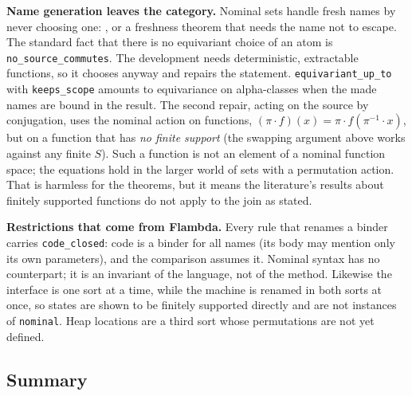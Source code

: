 \documentclass[10pt,a4paper]{article}
\newcommand\code[1]{\texttt{#1}}
\begin{document}
\textbf{Name generation leaves the category.} Nominal sets handle fresh names
by never choosing one: , or a freshness theorem that needs the
name not to escape. The standard fact that there is no equivariant choice of
an atom is \code{no\_source\_commutes}. The development needs deterministic,
extractable functions, so it chooses anyway and repairs the statement.
\code{equivariant\_up\_to} with \code{keeps\_scope} amounts to equivariance on
alpha-classes when the made names are bound in the result. The second repair,
acting on the source by conjugation, uses the nominal action on functions,
$(\pi\cdot f)(x) = \pi\cdot f(\pi^{-1}\cdot x)$, but on a function that has
\emph{no finite support} (the swapping argument above works against any
finite $S$). Such a function is not an element of a nominal function space;
the equations hold in the larger world of sets with a permutation action.
That is harmless for the theorems, but it means the literature's results about
finitely supported functions do not apply to the join as stated.

\textbf{Restrictions that come from Flambda.} Every rule that renames a binder
carries \code{code\_closed}: code is a binder for all names (its body may
mention only its own parameters), and the comparison assumes it. Nominal
syntax has no counterpart; it is an invariant of the language, not of the
method. Likewise the interface is one sort at a time, while the machine is
renamed in both sorts at once, so states are shown to be finitely supported
directly and are not instances of \code{nominal}. Heap locations are a third
sort whose permutations are not yet defined.

\subsection{Summary}
\end{document}
